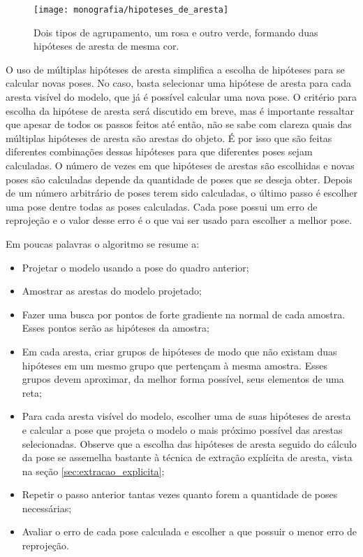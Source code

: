 \begin{figure}[!ht]
\centering\texttt{[image: monografia/hipoteses\_de\_aresta]}
\caption{Dois tipos de agrupamento, um rosa e outro verde, formando duas hipóteses de aresta de mesma cor.}
\label{hipoteses_de_aresta}
\end{figure}

O uso de múltiplas hipóteses de aresta simplifica a escolha de hipóteses para se calcular novas poses. No caso, basta selecionar uma hipótese de aresta para cada aresta visível do modelo, que já é possível calcular uma nova pose. O critério para escolha da hipótese de aresta será discutido em breve, mas é importante ressaltar que apesar de todos os passos feitos até então, não se sabe com clareza quais das múltiplas hipóteses de aresta são arestas do objeto. É por isso que são feitas diferentes combinações dessas hipóteses para que diferentes poses sejam calculadas. O número de vezes em que hipóteses de arestas são escolhidas e novas poses são calculadas depende da quantidade de poses que se deseja obter. Depois de um número arbitrário de poses terem sido calculadas, o último passo é escolher uma pose dentre todas as poses calculadas. Cada pose possui um erro de reprojeção e o valor desse erro é o que vai ser usado para escolher a melhor pose.

Em poucas palavras o algoritmo se resume a:

\begin{itemize}
	\item Projetar o modelo usando a pose do quadro anterior;
	\item Amostrar as arestas do modelo projetado;
	\item Fazer uma busca por pontos de forte gradiente na normal de cada amostra. Esses pontos serão as hipóteses da amostra;
	\item Em cada aresta, criar grupos de hipóteses de modo que não existam duas hipóteses em um mesmo grupo que pertençam à mesma amostra. Esses grupos devem aproximar, da melhor forma possível, seus elementos de uma reta;
	\item Para cada aresta visível do modelo, escolher uma de suas hipóteses de aresta e calcular a pose que projeta o modelo o mais próximo possível das arestas selecionadas. Observe que a escolha das hipóteses de aresta seguido do cálculo da pose se assemelha bastante à técnica de extração explícita de aresta, vista na seção \ref{sec:extracao_explicita};
	\item Repetir o passo anterior tantas vezes quanto forem a quantidade de poses necessárias;
	\item Avaliar o erro de cada pose calculada e escolher a que possuir o menor erro de reprojeção.
\end{itemize}

